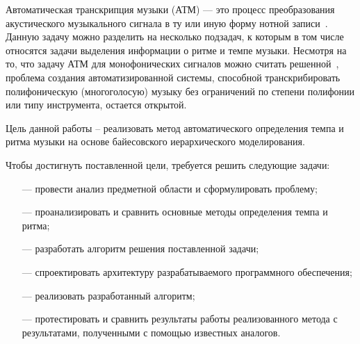
Автоматическая транскрипция музыки (АТМ) — это процесс преобразования акустического музыкального сигнала в ту или иную форму нотной записи~\cite{future_dir}. Данную задачу можно разделить на несколько подзадач, к которым в том числе относятся задачи выделения информации о ритме и темпе музыки. Несмотря на то, что задачу АТМ для монофонических сигналов можно считать решенной~\cite{future_dir}, проблема создания автоматизированной системы, способной транскрибировать полифоническую (многоголосую) музыку без ограничений по степени полифонии или типу инструмента, остается открытой.

Цель данной работы – реализовать метод автоматического определения темпа и ритма музыки на основе байесовского иерархического моделирования.

Чтобы достигнуть поставленной цели, требуется решить следующие задачи:
\begin{itemize}
	\item[---] провести анализ предметной области и сформулировать проблему;
	\item[---] проанализировать и сравнить основные методы определения темпа и ритма;
	\item[---] разработать алгоритм решения поставленной задачи;
	\item[---] спроектировать архитектуру разрабатываемого программного обеспечения;
	\item[---] реализовать разработанный алгоритм;
	\item[---] протестировать и сравнить результаты работы реализованного метода с результатами, полученными с помощью известных аналогов.
\end{itemize}